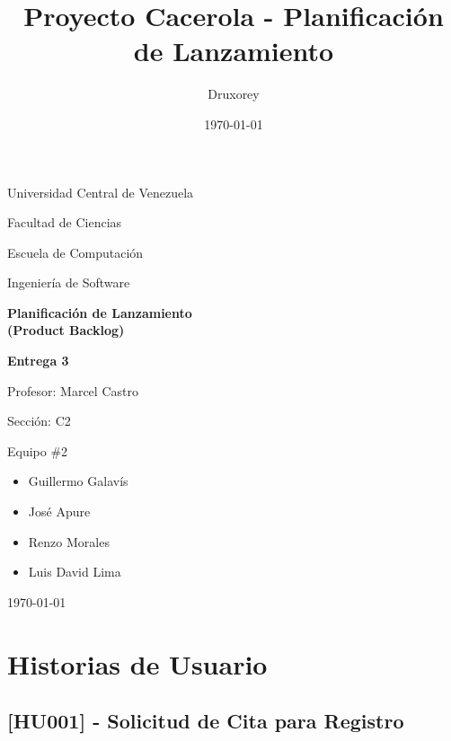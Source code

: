 \documentclass[12pt]{article}
\title{Proyecto Cacerola - Planificación de Lanzamiento} %
\author{Druxorey} %
\date{\today} %
\begin{document}
\begin{titlepage}
	\centering
	\vspace{1cm}
	{\large {Universidad Central de Venezuela}\par}
	{\large {Facultad de Ciencias}\par}
	{\large {Escuela de Computación}\par}
	{\large {Ingeniería de Software}\par}
	\vspace{6cm}
	{\LARGE \textbf{Planificación de Lanzamiento \\ (Product Backlog)}\par}
	\vspace{0.25cm}
	{\Large \textbf{Entrega 3}\par}
	\vfill
	\begin{flushleft}
		{\large Profesor: Marcel Castro\par\vspace{-0.5em}}
		{\large Sección: C2\par\vspace{-0.5em}}
		{\large Equipo \#2\par\vspace{-1em}}
		\begin{itemize}
			\item Guillermo Galavís\vspace{-0.5em}
			\item José Apure\vspace{-0.5em}
			\item Renzo Morales\vspace{-0.5em}
			\item Luis David Lima\vspace{-0.5em}
		\end{itemize}
	\end{flushleft}
	\vspace{0.5cm}
	\centering
	{\large \today\par}
\end{titlepage}

\setcounter{tocdepth}{2} %
\tableofcontents %

\pagebreak

\section{Historias de Usuario}

\subsection{[HU001] - Solicitud de Cita para Registro}
\end{document}
